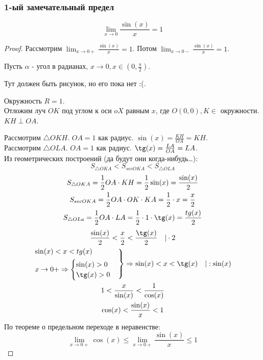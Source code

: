 \subsubsection*{1-ый замечательный предел}

\begin{theorem}
  \[
    \boxed{\lim_{x \to 0} \frac{\sin(x)}{x} = 1}
  \]  
\end{theorem}
\begin{proof}
  Рассмотрим $\lim_{x \to 0+} \frac{\sin(x)}{x} = 1$. Потом $\lim_{x \to 0-} \frac{\sin(x)}{x} = 1$. 
  
  Пусть $\alpha$ - угол в радианах, $x \to 0, x \in (0, \frac{\pi}{2})$.

  Тут должен быть рисунок, но его пока нет :(.

  Окружность $R = 1$.\\
  Отложим луч $OK$ под углом к оси $oX$ равным $x$, где $O(0, 0), K \in $ окружности. \\
  $KH \perp OA$.

  Рассмотрим $\triangle OKH$. $OA = 1$ как радиус. $\sin(x) = \frac{KH}{OA} = KH$. \\
  Рассмотрим $\triangle OLA$. $OA = 1$ как радиус. $\tg(x) = \frac{LA}{OA} = LA$. \\
  Из геометрических построений (да будут они когда-нибудь\ldots): \[
    S_{\triangle OKA} < S_{sec OKA} < S_{\triangle OLA}
  \] 
  \begin{gather*}
    S_{\triangle OKA} = \frac{1}{2} OA \cdot KH = \frac{1}{2} \sin(x) = \frac{\sin(x)}{2} \\
    S_{sec OKA} = \frac{1}{2} OA \cdot OK \cdot KA = \frac{1}{2} \cdot x = \frac{x}{2} \\
    S_{\triangle OLa} = \frac{1}{2} OA \cdot LA = \frac{1}{2} \cdot 1 \cdot \tg(x) = \frac{tg(x)}{2}
  \end{gather*}
  \begin{gather*}
    \frac{\sin(x)}{2} < \frac{x}{2} < \frac{\tg(x)}{2} \quad | \cdot 2 \\
    \begin{rcases}
      \sin(x) < x < tg(x) \\
      x \to 0+ \implies \begin{cases}
        \sin(x) > 0 \\
        \tg(x) > 0
      \end{cases}
    \end{rcases} \implies 
    \sin(x) < x < \tg(x) \quad | : \sin(x) \\
    1 < \frac{x}{\sin(x)} < \frac{1}{\cos(x)} \\
    \cos(x) < \frac{\sin(x)}{x} < 1
  \end{gather*}
   По теореме о предельном переходе в неравенстве: \[
   \lim_{x \to 0+} \cos(x) \le \lim_{x \to 0+} \frac{\sin(x)}{x} \le 1
   \] 


\end{proof}
